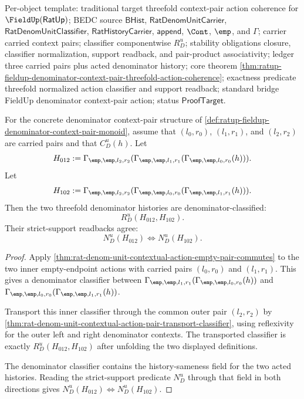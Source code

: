 Per-object template: traditional target threefold context-pair action coherence
for $\FieldUp(\mathsf{RatUp})$; BEDC source $\mathsf{BHist}$,
$\mathsf{RatDenomUnitCarrier}$, $\mathsf{RatDenomUnitClassifier}$,
$\mathsf{RatHistoryCarrier}$, $\mathsf{append}$, $\Cont$, $\emp$, and $\Gamma$;
carrier carried context pairs; classifier componentwise $R_D^u$; stability
obligations closure, classifier normalization, support readback, and pair-product
associativity; ledger three carried pairs plus acted denominator history; core
theorem
\autoref{thm:ratup-fieldup-denominator-context-pair-threefold-action-coherence};
exactness predicate threefold normalized action classifier and support readback;
standard bridge FieldUp denominator context-pair action; status
$\mathsf{ProofTarget}$.

\begin{theorem}
\label{thm:ratup-fieldup-context-pair-adjacent-swap-exit-row}
For the concrete denominator context-pair structure of
\autoref{def:ratup-fieldup-denominator-context-pair-monoid}, assume that
$(l_0,r_0)$, $(l_1,r_1)$, and $(l_2,r_2)$ are carried pairs and that
$C_D^u(h)$. Let
$$
H_{012}:=
\Gamma_{\emp,\emp,l_2,r_2}
(\Gamma_{\emp,\emp,l_1,r_1}(\Gamma_{\emp,\emp,l_0,r_0}(h))).
$$
Let
$$
H_{102}:=
\Gamma_{\emp,\emp,l_2,r_2}
(\Gamma_{\emp,\emp,l_0,r_0}(\Gamma_{\emp,\emp,l_1,r_1}(h))).
$$
Then the two threefold denominator histories are denominator-classified:
$$
R_D^u(H_{012},H_{102}).
$$
Their strict-support readbacks agree:
$$
N_D^u(H_{012})
\Longleftrightarrow
N_D^u(H_{102}).
$$
\end{theorem}
\begin{proof}
Apply
\autoref{thm:rat-denom-unit-contextual-action-empty-pair-commutes} to the two
inner empty-endpoint actions with carried pairs $(l_0,r_0)$ and $(l_1,r_1)$.
This gives a denominator classifier between
$\Gamma_{\emp,\emp,l_1,r_1}(\Gamma_{\emp,\emp,l_0,r_0}(h))$ and
$\Gamma_{\emp,\emp,l_0,r_0}(\Gamma_{\emp,\emp,l_1,r_1}(h))$.

Transport this inner classifier through the common outer pair $(l_2,r_2)$ by
\autoref{thm:rat-denom-unit-contextual-action-pair-transport-classifier}, using
reflexivity for the outer left and right denominator contexts. The transported
classifier is exactly $R_D^u(H_{012},H_{102})$ after unfolding the two displayed
definitions.

The denominator classifier contains the history-sameness field for the two acted
histories. Reading the strict-support predicate $N_D^u$ through that field in
both directions gives
$N_D^u(H_{012})\Longleftrightarrow N_D^u(H_{102})$.
\end{proof}

